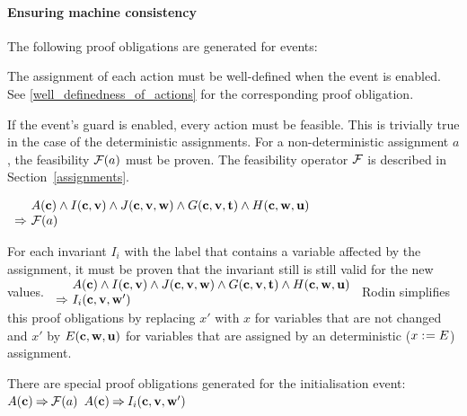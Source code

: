 \paragraph{Ensuring machine consistency}
\label{consistency_proof_obligations}
The following proof obligations are generated for events:

The assignment of each action must be well-defined when the event is enabled. See
  \ref{well_definedness_of_actions} for the corresponding proof obligation.
  
If the event's guard is enabled, every action must be feasible.
  This is trivially true in the case of the deterministic assignments.
  For a non-deterministic assignment $a$, the feasibility $\mathcal{F}(a)$ must be proven.
  The feasibility operator $\mathcal{F}$ is described in Section~\ref{assignments}.
  
  {$\begin{array}{r@{\ }l}
      & \axioms \land \absinvariants \land \concinvariants
      \land \absguards \land \concguards \\
      \limp & \actfis(a)      
    \end{array}$}

For each invariant $I_i$ with the label  
  that contains a variable affected by the assignment, it must be proven
  that the invariant still is still valid for the new values.
  {}%
  {$\begin{array}{r@{\ }l}
      & \axioms \land \absinvariants \land \concinvariants 
      \land \absguards \land \concguards \\
      \limp & I_i(\allconstants,\allvariables')      
    \end{array}$}
  Rodin simplifies this proof obligations by replacing $x'$ with $x$ for variables that are not
  changed and $x'$ by $E(\mathbf{c},\mathbf{w},\mathbf{u})$ 
  for variables that are assigned by an deterministic ($x \mathrel{:\mkern1mu=} E$) assignment.

There are special proof obligations generated for the initialisation event:
  {$A(\mathbf{c}) \mathbin\Rightarrow  \mathcal{F}(a)$}
  {}%
  {$A(\mathbf{c}) \mathbin\Rightarrow I_i(\mathbf{c},{\mathbf{v},\mathbf{w}}')$}

